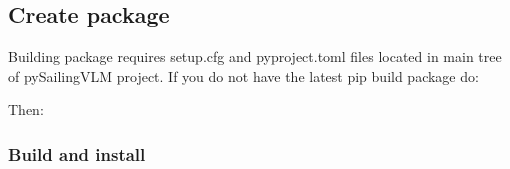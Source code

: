 \documentclass[letterpaper,10pt,english]{jupyterBook}
\begin{document}
\begin{sphinxVerbatim}[commandchars=\\\{\}]
    
\end{sphinxVerbatim}


\subsection{Create package}
\label{\detokenize{chapters/installation:create-package}}
\sphinxAtStartPar
Building package requires setup.cfg and pyproject.toml files located in main tree of pySailingVLM project. If you do not have the latest pip build package do:

\begin{sphinxVerbatim}[commandchars=\\\{\}]
   
\end{sphinxVerbatim}

\sphinxAtStartPar
Then:

\begin{sphinxVerbatim}[commandchars=\\\{\}]
  
\end{sphinxVerbatim}


\subsubsection{Build and install}
\label{\detokenize{chapters/installation:build-and-install}}
\begin{sphinxVerbatim}[commandchars=\\\{\}]
  
\end{sphinxVerbatim}

\begin{sphinxVerbatim}[commandchars=\\\{\}]
  
\end{sphinxVerbatim}

\sphinxstepscope
\end{document}
